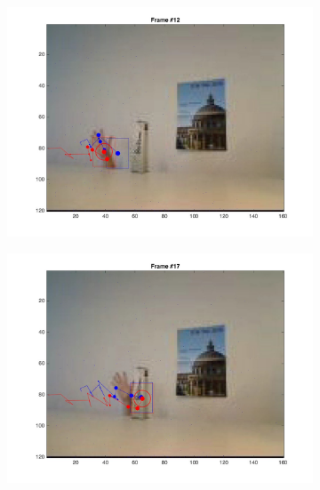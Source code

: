 \documentclass{ethz_report}
\begin{document}
\begin{figure}[h]
\begin{subfigure}[b]{.25\textwidth}
        \includegraphics[width=1\linewidth]{images/video2_noise_high_11}
    \end{subfigure}%
    \begin{subfigure}[b]{.25\textwidth}
        \centering
        \includegraphics[width=1\linewidth]{images/video2_noise_high_16}
    \end{subfigure}
    \begin{subfigure}[b]{.25\textwidth}
        \centering

\end{subfigure}
\end{figure}
\end{document}
